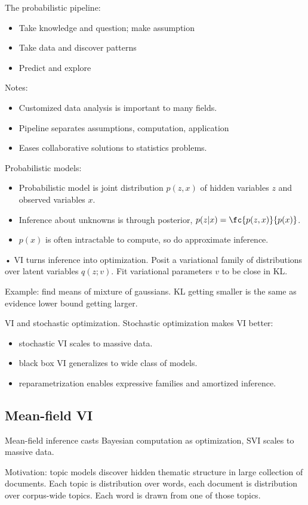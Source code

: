 The probabilistic pipeline:
\begin{itemize}
\item
Take knowledge and question; make assumption
\item
Take data and discover patterns
\item
Predict and explore
\end{itemize}
Notes:
\begin{itemize}
\item
Customized data analysis is important to many fields.
\item
Pipeline separates assumptions, computation, application
\item
Eases collaborative solutions to statistics problems.
\end{itemize}
Probabilistic models:
\begin{itemize}
\item
Probabilistic model is joint distribution $p(z,x)$ of hidden variables $z$ and observed variables $x$.
\item
Inference about unknowns is through posterior, $p(z|x) = \fc{p(z,x)}{p(x)}$.
\item
$p(x)$ is often intractable to compute, so do approximate inference.
\end{itemize}•
VI turns inference into optimization.  Posit a variational family of distributions over latent variables
$q(z;v)$. Fit variational parameters $v$ to be close in KL.

Example: find means of mixture of gaussians.
KL getting smaller is the same as evidence lower bound getting larger.

VI and stochastic optimization. Stochastic optimization makes VI better:
\begin{itemize}
\item
stochastic VI scales to massive data.
\item
black box VI generalizes to wide class of models.
\item
reparametrization enables expressive families and amortized inference.
\end{itemize}

\subsection{Mean-field VI}

Mean-field inference casts Bayesian computation as optimization, SVI scales to massive data.

Motivation: topic models discover hidden thematic structure in large collection of documents.
Each topic is distribution over words, each document is distribution over corpus-wide topics. Each word is drawn from one of those topics.

